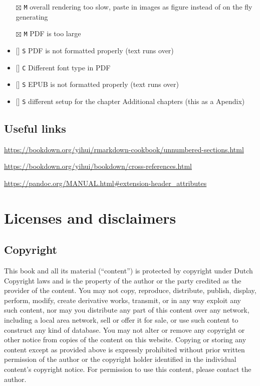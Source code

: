 \documentclass[
]{book}
\newcommand{\passthrough}[1]{#1}
\providecommand{\tightlist}{%
  \setlength{\itemsep}{0pt}\setlength{\parskip}{0pt}}
\begin{document}
\begin{itemize}
\tightlist
\item[$\boxtimes$]
  \passthrough{\lstinline!M!} overall rendering too slow, paste in images as figure instead of on the fly generating
\item[$\boxtimes$]
  \passthrough{\lstinline!M!} PDF is too large
\item
  {[}{]} \passthrough{\lstinline!S!} PDF is not formatted properly (text runs over)
\item
  {[}{]} \passthrough{\lstinline!C!} Different font type in PDF
\item
  {[}{]} \passthrough{\lstinline!S!} EPUB is not formatted properly (text runs over)
\item
  {[}{]} \passthrough{\lstinline!S!} different setup for the chapter Additional chapters (this as a Apendix)
\end{itemize}

\hypertarget{useful-links}{%
\section{Useful links}\label{useful-links}}

\url{https://bookdown.org/yihui/rmarkdown-cookbook/unnumbered-sections.html}

\url{https://bookdown.org/yihui/bookdown/cross-references.html}

\url{https://pandoc.org/MANUAL.html\#extension-header_attributes}

\hypertarget{license}{%
\chapter{Licenses and disclaimers}\label{license}}

\hypertarget{copyright}{%
\section{Copyright}\label{copyright}}

This book and all its material (``content'') is protected by copyright under Dutch Copyright laws and is the property of the author or the party credited as the provider of the content. You may not copy, reproduce, distribute, publish, display, perform, modify, create derivative works, transmit, or in any way exploit any such content, nor may you distribute any part of this content over any network, including a local area network, sell or offer it for sale, or use such content to construct any kind of database. You may not alter or remove any copyright or other notice from copies of the content on this website. Copying or storing any content except as provided above is expressly prohibited without prior written permission of the author or the copyright holder identified in the individual content's copyright notice. For permission to use this content, please contact the author.
\end{document}
